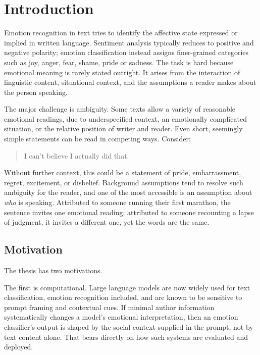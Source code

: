 \chapter{Introduction}
\label{c:introduction}

\noindent
Emotion recognition in text tries to identify the affective state expressed or implied in written
language. Sentiment analysis typically reduces to positive and negative polarity; emotion
classification instead assigns finer-grained categories such as joy, anger, fear, shame, pride or
sadness. The task is hard because emotional meaning is rarely stated outright. It arises
from the interaction of linguistic content, situational context, and the assumptions a reader
makes about the person speaking.

The major challenge is ambiguity. Some texts allow a variety of reasonable emotional readings,
due to underspecified context, an emotionally complicated situation, or the relative position of
writer and reader. Even short, seemingly simple statements can be read in competing ways.
Consider:

\begin{quote}
I can't believe I actually did that.
\end{quote}

\noindent
Without further context, this could be a statement of pride, embarrassment, regret, excitement,
or disbelief. Background assumptions tend to resolve such ambiguity for the reader, and one of
the most accessible is an assumption about \emph{who} is speaking. Attributed to someone running
their first marathon, the sentence invites one emotional reading; attributed to someone
recounting a lapse of judgment, it invites a different one, yet the words are the same.

\section{Motivation}
\label{intro:motivation}

\noindent
The thesis has two motivations.

The first is computational. Large language models are now widely used for text classification,
emotion recognition included, and are known to be sensitive to prompt framing and contextual
cues. If minimal author information systematically changes a model's emotional interpretation,
then an emotion classifier's output is shaped by the social context supplied in the prompt, not
by text content alone. That bears directly on how such systems are evaluated and deployed.

